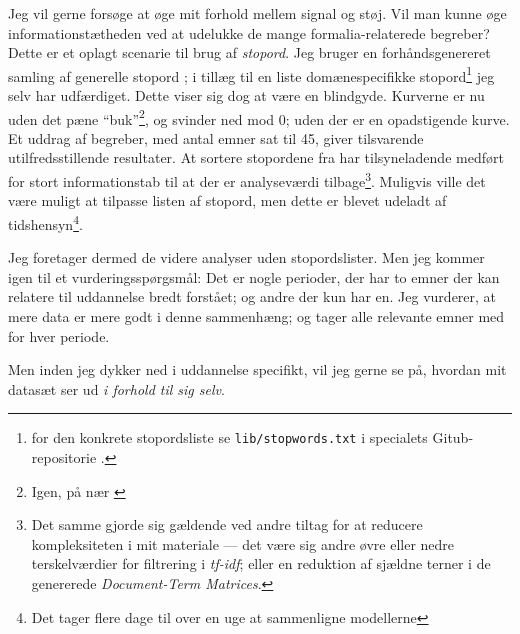 Jeg vil gerne forsøge at øge mit forhold mellem signal og støj.
Vil man kunne øge informationstætheden ved at udelukke de mange formalia-relaterede begreber?
Dette er et oplagt scenarie til brug af \textit{stopord}.
Jeg bruger en forhåndsgenereret samling af generelle stopord \autocite{stopwords-isoStopwordsISO2020};
i tillæg til en liste domænespecifikke stopord\footnote{
for den konkrete stopordsliste se \texttt{lib/stopwords.txt} i specialets Gitub-repositorie \autocite{andersenMasterThesis2020}.}
jeg selv har udfærdiget.
Dette viser sig dog at være en blindgyde.
Kurverne er nu uden det pæne “buk”\footnote{Igen, på nær \autocite{deveaudAccurateEffectiveLatent2014}}, og svinder ned mod 0; uden der er en opadstigende kurve.
Et uddrag af begreber, med antal emner sat til 45, giver tilsvarende utilfredsstillende resultater.
At sortere stopordene fra har tilsyneladende medført for stort informationstab til at der er analyseværdi tilbage\footnote{
Det samme gjorde sig gældende ved andre tiltag for at reducere kompleksiteten i mit materiale —
det være sig andre øvre eller nedre terskelværdier for filtrering i \textit{tf-idf};
eller en reduktion af sjældne terner i de genererede \textit{Document-Term Matrices}.}.
Muligvis ville det være muligt at tilpasse listen af stopord, men dette er blevet udeladt af tidshensyn\footnote{Det tager flere dage til over en uge at sammenligne modellerne}.

Jeg foretager dermed de videre analyser uden stopordslister.
Men jeg kommer igen til et vurderingsspørgsmål:
Det er nogle perioder, der har to emner der kan relatere til uddannelse bredt forstået; og andre der kun har en.
Jeg vurderer, at mere data er mere godt i denne sammenhæng; og tager alle relevante emner med for hver periode.

Men inden jeg dykker ned i uddannelse specifikt, vil jeg gerne se på, hvordan mit datasæt ser ud \textit{i forhold til sig selv}.

